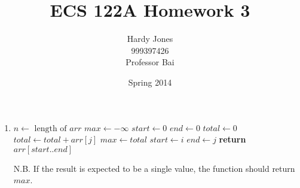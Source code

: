 \documentclass[12pt,letterpaper]{article}
\title{ECS 122A Homework 3\vspace{-2ex}}
\author{Hardy Jones\\
        999397426\\
        Professor Bai\vspace{-2ex}}
\date{Spring 2014}
\newcommand{\Let}[2]{\State $#1 \gets #2$}
\begin{document}
  \maketitle

  \begin{enumerate}
    \item
      \begin{algorithm}
        \begin{algorithmic}[1]
            \Let{n}{\textrm{ length of }arr}
            \Let{max}{-\infty}
            \Let{start}{0}
            \Let{end}{0}
              \Let{total}{0}
                \Let{total}{total + arr[j]}
                  \Let{max}{total}
                  \Let{start}{i}
                  \Let{end}{j}
                \EndIf
              \EndFor
            \EndFor
            \State \textbf{return} $arr[start..end]$
          \EndFunction
        \end{algorithmic}
      \end{algorithm}

      N.B. If the result is expected to be a single value,
      the function should return $max$.
  \end{enumerate}
\end{document}
